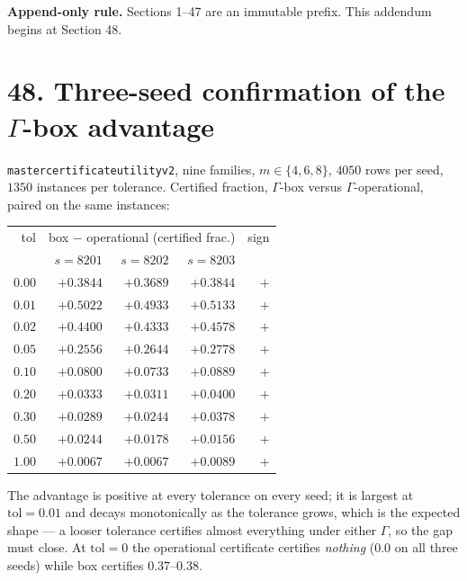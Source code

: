 \documentclass[9pt,twocolumn]{article}
\renewcommand{\_}{\CIGunderscore\allowbreak}
\begin{document}
\sloppy
{}

\textbf{Append-only rule.} Sections 1--47 are an immutable prefix. This addendum begins at Section 48.

\section*{48. Three-seed confirmation of the $\Gamma$-box advantage}
\texttt{master\_certificate\_utility\_v2}, nine families, $m\in\{4,6,8\}$, $4050$ rows per seed, $1350$ instances per tolerance. Certified fraction, $\Gamma$-box versus $\Gamma$-operational, paired on the same instances:
\begin{center}\scriptsize
\begin{tabularx}{0.98\columnwidth}{r r r r r}
\toprule
tol & \multicolumn{3}{c}{box $-$ operational (certified frac.)} & sign\\
 & $s{=}8201$ & $s{=}8202$ & $s{=}8203$ & \\
\midrule
$0.00$ & $+0.3844$ & $+0.3689$ & $+0.3844$ & $+$\\
$0.01$ & $+0.5022$ & $+0.4933$ & $+0.5133$ & $+$\\
$0.02$ & $+0.4400$ & $+0.4333$ & $+0.4578$ & $+$\\
$0.05$ & $+0.2556$ & $+0.2644$ & $+0.2778$ & $+$\\
$0.10$ & $+0.0800$ & $+0.0733$ & $+0.0889$ & $+$\\
$0.20$ & $+0.0333$ & $+0.0311$ & $+0.0400$ & $+$\\
$0.30$ & $+0.0289$ & $+0.0244$ & $+0.0378$ & $+$\\
$0.50$ & $+0.0244$ & $+0.0178$ & $+0.0156$ & $+$\\
$1.00$ & $+0.0067$ & $+0.0067$ & $+0.0089$ & $+$\\
\bottomrule
\end{tabularx}
\end{center}
The advantage is positive at every tolerance on every seed; it is largest at $\text{tol}=0.01$ and decays monotonically as the tolerance grows, which is the expected shape --- a looser tolerance certifies almost everything under either $\Gamma$, so the gap must close. At $\text{tol}=0$ the operational certificate certifies \emph{nothing} ($0.0$ on all three seeds) while box certifies $0.37$--$0.38$.
\end{document}
